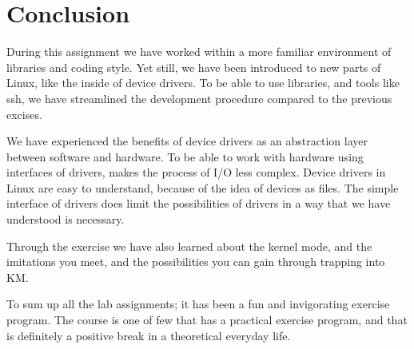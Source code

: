 \section{Conclusion}
During this assignment we have worked within a more familiar environment of  libraries and coding style. Yet still, we have been introduced to new parts of Linux, like the inside of device drivers. To be able to use libraries, and tools like ssh, we have streamlined the development procedure compared to the previous excises.

We have experienced the benefits of device drivers as an abstraction layer between software and hardware. To be able to work with hardware using interfaces of drivers, makes the process of I/O less complex. Device drivers in Linux are easy to understand, because of the idea of devices as files. The simple interface of drivers does limit the possibilities of drivers in a way that we have understood is necessary.

Through the exercise we have also learned about the kernel mode, and the imitations you meet, and the possibilities you can gain through trapping into KM.

To sum up all the lab assignments; it has been a fun and invigorating exercise program. The course is one of few that has a practical exercise program, and that is definitely a positive break in a theoretical everyday life.
